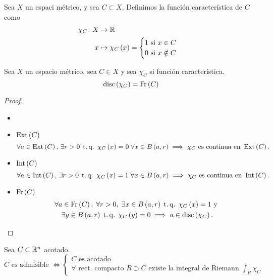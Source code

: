 \begin{defi}
    Sea $X$ un espaci métrico, y sea $C\subset X$. Definimos la función característica de $C$ como
    \begin{align}
        \chi_C \colon X &\to \mathbb{R} \\
        x &\mapsto \chi_C \left( x \right) = \begin{cases} 1 \text{ si } x \in C \\ 0 \text{ si } x \notin C \end{cases}
    \end{align}
\end{defi}

\begin{lema}
    Sea $X$ un espacio métrico, sea $C \in X$ y sea $\chi_C$ si función característica.
    \[
        \operatorname{disc} \left( \chi_C \right) = \operatorname{Fr} \left( C \right)
    \]
\end{lema}
\begin{proof}
    \begin{itemize} \item[]
        \item $\operatorname{Ext} \left( C \right)$
            \[
                \forall a \in \operatorname{Ext} \left( C \right), \, \exists r > 0 \operatorname{\;t.q.\;} \chi_C \left( x \right) = 0 \; \forall x \in B \left( a, r \right) \implies \chi_C \text{ es continua en } \operatorname{Ext} \left( C \right) .
            \]
        \item $\operatorname{Int} \left( C \right)$
            \[
                \forall a \in \operatorname{Int} \left( C \right), \, \exists r > 0 \operatorname{\;t.q.\;} \chi_C \left( x \right) = 1 \; \forall x \in B \left( a, r \right) \implies \chi_C \text{ es continua en } \operatorname{Int} \left( C \right) .
            \]
        \item $\operatorname{Fr} \left( C \right)$
            \begin{gather*}
                \forall a \in \operatorname{Fr} \left( C \right) , \; \forall r > 0, \; \exists x \in B \left( a, r \right) \operatorname{\;t.q.\;} \chi_C \left( x \right) = 1 \text{ y } \\ \exists y \in B \left( a, r \right) \operatorname{\;t.q.\;} \chi_C \left( y \right) = 0 \implies a \in \operatorname{disc} \left( \chi_C \right).
            \end{gather*}
    \end{itemize}
\end{proof}

\begin{col}
    Sea $C \subset \mathbb{R}^n$ acotado.
    \[
        C \text{ es admisible } \iff \begin{cases} C \text{ es acotado } \\ \forall \text{ rect. compacto } R \supset C \text{ existe la integral de Riemann } \int_R \chi_C \end{cases}
    \]
\end{col}


